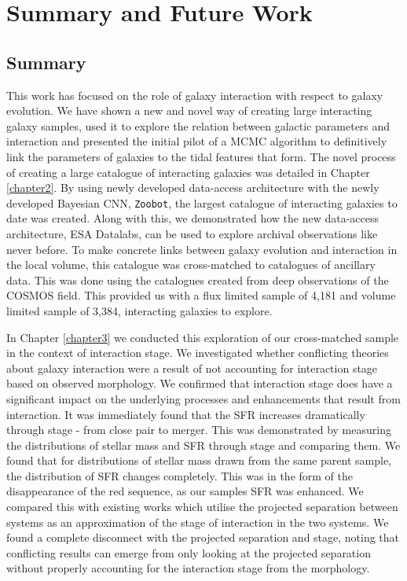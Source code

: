 \chapter{Summary and Future Work}\label{chapter:conclusion}
\section{Summary}
\noindent This work has focused on the role of galaxy interaction with respect to galaxy evolution. We have shown a new and novel way of creating large interacting galaxy samples, used it to explore the relation between galactic parameters and interaction and presented the initial pilot of a MCMC algorithm to definitively link the parameters of galaxies to the tidal features that form. The novel process of creating a large catalogue of interacting galaxies was detailed in Chapter \ref{chapter2}. By using newly developed data-access architecture with the newly developed Bayesian CNN, \texttt{Zoobot}, the largest catalogue of interacting galaxies to date was created. Along with this, we demonstrated how the new data-access architecture, ESA Datalabs, can be used to explore archival observations like never before. To make concrete links between galaxy evolution and interaction in the local volume, this catalogue was cross-matched to catalogues of ancillary data. This was done using the catalogues created from deep observations of the COSMOS field. This provided us with a flux limited sample of 4,181 and volume limited sample of 3,384, interacting galaxies to explore.

In Chapter \ref{chapter3} we conducted this exploration of our cross-matched sample in the context of interaction stage. We investigated whether conflicting theories about galaxy interaction were a result of not accounting for interaction stage based on observed morphology. We confirmed that interaction stage does have a significant impact on the underlying processes and enhancements that result from interaction. It was immediately found that the SFR increases dramatically through stage - from close pair to merger. This was demonstrated by measuring the distributions of stellar mass and SFR through stage and comparing them. We found that for distributions of stellar mass drawn from the same parent sample, the distribution of SFR changes completely. This was in the form of the disappearance of the red sequence, as our samples SFR was enhanced. We compared this with existing works which utilise the projected separation between systems as an approximation of the stage of interaction in the two systems. We found a complete disconnect with the projected separation and stage, noting that conflicting results can emerge from only looking at the projected separation without properly accounting for the interaction stage from the morphology. 

